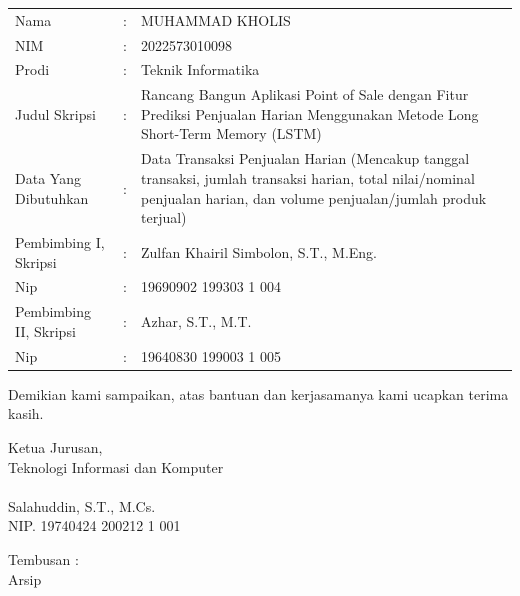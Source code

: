 \documentclass[12pt,a4paper]{article}
\begin{document}
\vspace{1.5em}

\noindent
\renewcommand{\arraystretch}{1.2}
\setlength{\tabcolsep}{4pt}
\begin{tabularx}{\textwidth}{@{}p{4.8cm} c X@{}}
    Nama & : & MUHAMMAD KHOLIS \\
    NIM & : & 2022573010098 \\
    Prodi & : & Teknik Informatika \\
    Judul Skripsi & : & Rancang Bangun Aplikasi Point of Sale dengan Fitur Prediksi Penjualan Harian Menggunakan Metode Long Short-Term Memory (LSTM) \\
    Data Yang Dibutuhkan & : & Data Transaksi Penjualan Harian (Mencakup tanggal transaksi, jumlah transaksi harian, total nilai/nominal penjualan harian, dan volume penjualan/jumlah produk terjual) \\
    Pembimbing I, Skripsi & : & Zulfan Khairil Simbolon, S.T., M.Eng. \\
    Nip & : & 19690902 199303 1 004 \\
    Pembimbing II, Skripsi & : & Azhar, S.T., M.T. \\
    Nip & : & 19640830 199003 1 005
\end{tabularx}

\vspace{2.5em}

Demikian kami sampaikan, atas bantuan dan kerjasamanya kami ucapkan terima kasih.

\vspace{3em}

\noindent
\begin{minipage}[t]{\textwidth}
    \hfill
    \begin{minipage}[t]{6.5cm}
        Ketua Jurusan, \\
        Teknologi Informasi dan Komputer \\
        \vspace{4.5em} \\
        Salahuddin, S.T., M.Cs. \\
        NIP. 19740424 200212 1 001
    \end{minipage}
\end{minipage}

\vspace{3em}

\noindent
Tembusan : \\
Arsip
\end{document}
